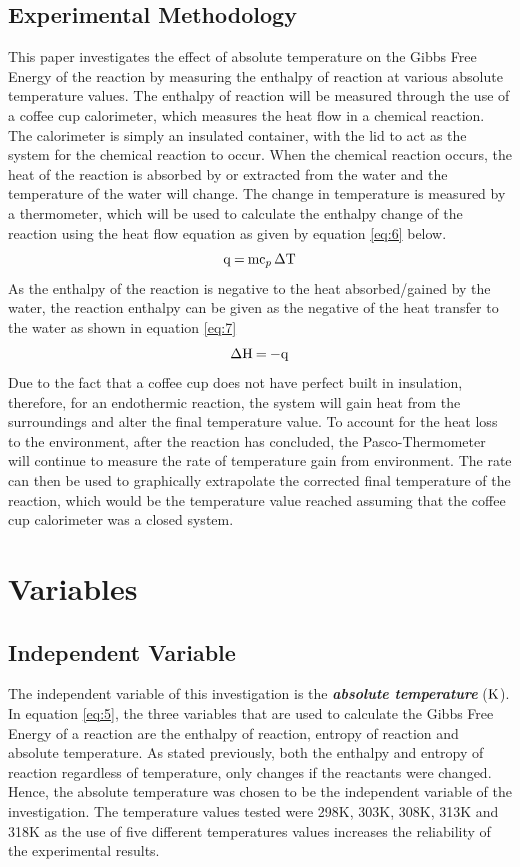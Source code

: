 \documentclass{article}
\begin{document}
\subsection{Experimental Methodology}
This paper investigates the effect of absolute temperature on the Gibbs Free Energy of the reaction by measuring the enthalpy of reaction at various absolute temperature values. The enthalpy of reaction will be measured through the use of a coffee cup calorimeter, which measures the heat flow in a chemical reaction. The calorimeter is simply an insulated container, with the lid to act as the system for the chemical reaction to occur. When the chemical reaction occurs, the heat of the reaction is absorbed by or extracted from the water and the temperature of the water will change. The change in temperature is measured by a thermometer, which will be used to calculate the enthalpy change of the reaction using the heat flow equation as given by equation \ref{eq:6} below.
\begin{equation}
\ce{q = mc_p \Delta T} \label{eq:6} 
\end{equation}
As the enthalpy of the reaction is negative to the heat absorbed/gained by the water, the reaction enthalpy can be given as the negative of the heat transfer to the water as shown in equation \ref{eq:7}
\begin{equation}
\ce{\Delta H = -q} \label{eq:7}
\end{equation}
Due to the fact that a coffee cup does not have perfect built in insulation, therefore, for an endothermic reaction, the system will gain heat from the surroundings and alter the final temperature value. To account for the heat loss to the environment, after the reaction has concluded, the Pasco-Thermometer will continue to measure the rate of temperature gain from environment. The rate can then be used to graphically extrapolate the corrected final temperature of the reaction, which would be the temperature value reached assuming that the coffee cup calorimeter was a closed system. 

\section{Variables}
\subsection{Independent Variable}
The independent variable of this investigation is the \textbf{\textit{absolute temperature }}($\ce{K}$). In equation \ref{eq:5}, the three variables that are used to calculate the Gibbs Free Energy of a reaction are the enthalpy of reaction, entropy of reaction and absolute temperature. As stated previously, both the enthalpy and entropy of reaction regardless of temperature, only changes if the reactants were changed. Hence, the absolute temperature was chosen to be the independent variable of the investigation. The temperature values tested were 298K, 303K, 308K, 313K and 318K as the use of five different temperatures values increases the reliability of the experimental results. 
\end{document}
